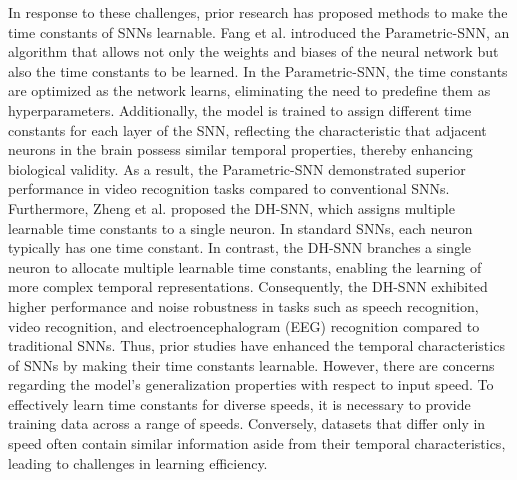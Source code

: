 In response to these challenges, prior research has proposed methods to make the time constants of SNNs learnable. 
Fang et al. introduced the Parametric-SNN, an algorithm that allows not only the weights and biases of the neural network but also the time constants to be learned. 
In the Parametric-SNN, the time constants are optimized as the network learns, eliminating the need to predefine them as hyperparameters. 
Additionally, the model is trained to assign different time constants for each layer of the SNN, reflecting the characteristic that adjacent neurons in the brain possess similar temporal properties, thereby enhancing biological validity. 
As a result, the Parametric-SNN demonstrated superior performance in video recognition tasks compared to conventional SNNs.
Furthermore, Zheng et al. proposed the DH-SNN, which assigns multiple learnable time constants to a single neuron. 
In standard SNNs, each neuron typically has one time constant. 
In contrast, the DH-SNN branches a single neuron to allocate multiple learnable time constants, enabling the learning of more complex temporal representations. 
Consequently, the DH-SNN exhibited higher performance and noise robustness in tasks such as speech recognition, video recognition, and electroencephalogram (EEG) recognition compared to traditional SNNs.
Thus, prior studies have enhanced the temporal characteristics of SNNs by making their time constants learnable. 
However, there are concerns regarding the model's generalization properties with respect to input speed. 
To effectively learn time constants for diverse speeds, it is necessary to provide training data across a range of speeds. 
Conversely, datasets that differ only in speed often contain similar information aside from their temporal characteristics, leading to challenges in learning efficiency.

